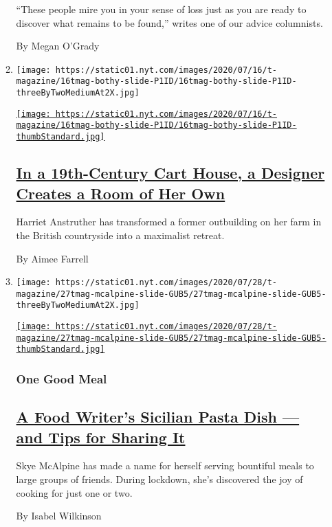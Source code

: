 \begin{enumerate}
\begin{enumerate}
    ``These people mire you in your sense of loss just as you are ready
    to discover what remains to be found,'' writes one of our advice
    columnists.

    By Megan O'Grady
  \item
    \texttt{[image: https://static01.nyt.com/images/2020/07/16/t-magazine/16tmag-bothy-slide-P1ID/16tmag-bothy-slide-P1ID-threeByTwoMediumAt2X.jpg]}

    \href{/2020/07/31/t-magazine/design-bothy-anstruther.html}{\texttt{[image: https://static01.nyt.com/images/2020/07/16/t-magazine/16tmag-bothy-slide-P1ID/16tmag-bothy-slide-P1ID-thumbStandard.jpg]}}

    \hypertarget{in-a-19th-century-cart-house-a-designer-creates-a-room-of-her-own}{%
    \subsection{\texorpdfstring{\href{/2020/07/31/t-magazine/design-bothy-anstruther.html}{In
    a 19th-Century Cart House, a Designer Creates a Room of Her
    Own}}{In a 19th-Century Cart House, a Designer Creates a Room of Her Own}}\label{in-a-19th-century-cart-house-a-designer-creates-a-room-of-her-own}}

    Harriet Anstruther has transformed a former outbuilding on her farm
    in the British countryside into a maximalist retreat.

    By Aimee Farrell
  \item
    \texttt{[image: https://static01.nyt.com/images/2020/07/28/t-magazine/27tmag-mcalpine-slide-GUB5/27tmag-mcalpine-slide-GUB5-threeByTwoMediumAt2X.jpg]}

    \href{/2020/07/29/t-magazine/skye-mcalpine-pasta-cooking.html}{\texttt{[image: https://static01.nyt.com/images/2020/07/28/t-magazine/27tmag-mcalpine-slide-GUB5/27tmag-mcalpine-slide-GUB5-thumbStandard.jpg]}}

    \hypertarget{one-good-meal}{%
    \subsubsection{One Good Meal}\label{one-good-meal}}

    \hypertarget{a-food-writers-sicilian-pasta-dish--and-tips-for-sharing-it}{%
    \subsection{\texorpdfstring{\href{/2020/07/29/t-magazine/skye-mcalpine-pasta-cooking.html}{A
    Food Writer's Sicilian Pasta Dish --- and Tips for Sharing
    It}}{A Food Writer's Sicilian Pasta Dish --- and Tips for Sharing It}}\label{a-food-writers-sicilian-pasta-dish--and-tips-for-sharing-it}}

    Skye McAlpine has made a name for herself serving bountiful meals to
    large groups of friends. During lockdown, she's discovered the joy
    of cooking for just one or two.

    By Isabel Wilkinson
  \end{enumerate}
\end{enumerate}

